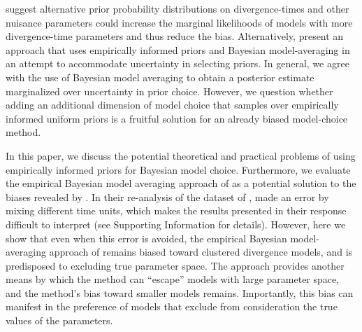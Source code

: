 \documentclass[letterpaper,12pt]{article}
\begin{document}
\begin{linenumbers}

\citet{Oaks2012} suggest alternative prior probability distributions on
divergence-times and other nuisance parameters could increase the marginal
likelihoods of models with more divergence-time parameters and thus reduce the
bias.
Alternatively, \citet{Hickerson2013} present an approach that uses empirically
informed priors and Bayesian model-averaging in an attempt to accommodate
uncertainty in selecting priors.
In general, we agree with the use of Bayesian model averaging to obtain a
posterior estimate marginalized over uncertainty in prior choice.
However, we question whether adding an additional dimension of model choice
that samples over empirically informed uniform priors is a fruitful solution
for an already biased model-choice method.

In this paper, we discuss the potential theoretical and practical problems of
using empirically informed priors for Bayesian model choice.
Furthermore, we evaluate the empirical Bayesian model averaging approach of
\citet{Hickerson2013} as a potential solution to the biases revealed by
\citet{Oaks2012}.
In their re-analysis of the dataset of \citet{Oaks2012}, \citet{Hickerson2013}
made an error by mixing different time units, which makes the results presented
in their response difficult to interpret (see Supporting Information for
details).
However, here we show that even when this error is avoided, the empirical
Bayesian model-averaging approach of \citet{Hickerson2013} remains biased
toward clustered divergence models, and is predisposed to excluding true
parameter space.
The approach provides another means by which the method can ``escape'' models
with large parameter space, and the method's bias toward smaller models
remains.
Importantly, this bias can manifest in the preference of models that exclude
from consideration the true values of the parameters.





\end{linenumbers}
\end{document}
